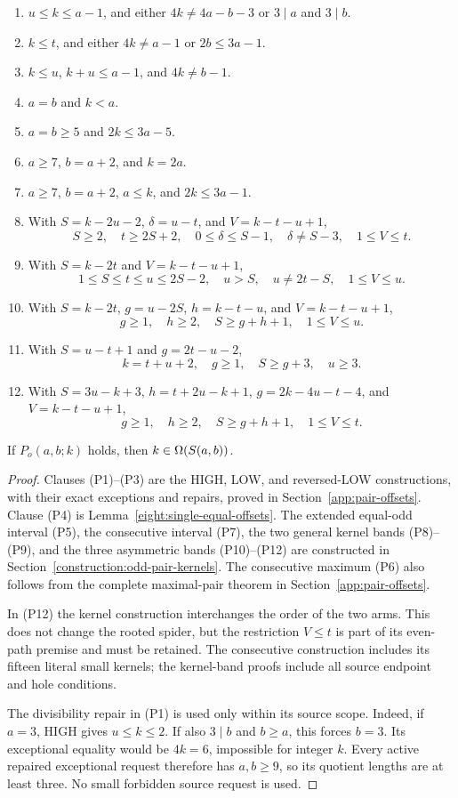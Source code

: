 \begin{enumerate}
\item[(P1)] $u\le k\le a-1$, and either
  $4k\ne4a-b-3$ or $3\mid a$ and $3\mid b$.
\item[(P2)] $k\le t$, and either $4k\ne a-1$ or $2b\le3a-1$.
\item[(P3)] $k\le u$, $k+u\le a-1$, and $4k\ne b-1$.
\item[(P4)] $a=b$ and $k<a$.
\item[(P5)] $a=b\ge5$ and $2k\le3a-5$.
\item[(P6)] $a\ge7$, $b=a+2$, and $k=2a$.
\item[(P7)] $a\ge7$, $b=a+2$, $a\le k$, and $2k\le3a-1$.
\item[(P8)] With $S=k-2u-2$, $\delta=u-t$, and $V=k-t-u+1$,
  \[
   S\ge2,\quad t\ge2S+2,\quad 0\le\delta\le S-1,
   \quad\delta\ne S-3,\quad1\le V\le t.
  \]
\item[(P9)] With $S=k-2t$ and $V=k-t-u+1$,
  \[
   1\le S\le t\le u\le2S-2,\quad u>S,
   \quad u\ne2t-S,\quad1\le V\le u.
  \]
\item[(P10)] With $S=k-2t$, $g=u-2S$, $h=k-t-u$, and $V=k-t-u+1$,
  \[
   g\ge1,\quad h\ge2,\quad S\ge g+h+1,\quad1\le V\le u.
  \]
\item[(P11)] With $S=u-t+1$ and $g=2t-u-2$,
  \[
   k=t+u+2,\quad g\ge1,\quad S\ge g+3,\quad u\ge3.
  \]
\item[(P12)] With $S=3u-k+3$, $h=t+2u-k+1$,
  $g=2k-4u-t-4$, and $V=k-t-u+1$,
  \[
   g\ge1,\quad h\ge2,\quad S\ge g+h+1,\quad1\le V\le t.
  \]
\end{enumerate}

\begin{lemma}\label{eight:odd-pair-sufficiency}
If $P_o(a,b;k)$ holds, then $k\in\Omega(S\!\left(a,b\right))$.
\end{lemma}
\begin{proof}
Clauses (P1)--(P3) are the HIGH, LOW, and reversed-LOW constructions,
with their exact exceptions and repairs, proved in
Section~\ref{app:pair-offsets}.  Clause (P4) is
Lemma~\ref{eight:single-equal-offsets}.  The extended equal-odd interval
(P5), the consecutive interval (P7), the two general kernel bands
(P8)--(P9), and the three asymmetric bands (P10)--(P12) are constructed
in Section~\ref{construction:odd-pair-kernels}.  The consecutive maximum
(P6) also follows from the complete maximal-pair theorem in
Section~\ref{app:pair-offsets}.

In (P12) the kernel construction interchanges the order of the two
arms.  This does not change the rooted spider, but the restriction
$V\le t$ is part of its even-path premise and must be retained.
The consecutive construction includes its fifteen literal small kernels;
the kernel-band proofs include all source endpoint and hole conditions.

The divisibility repair in (P1) is used only within its source scope.
Indeed, if $a=3$, HIGH gives $u\le k\le2$.  If also $3\mid b$ and
$b\ge a$, this forces $b=3$.  Its exceptional equality would be
$4k=6$, impossible for integer $k$.  Every active repaired exceptional
request therefore has $a,b\ge9$, so its quotient lengths are at least
three.  No small forbidden source request is used.
\end{proof}

